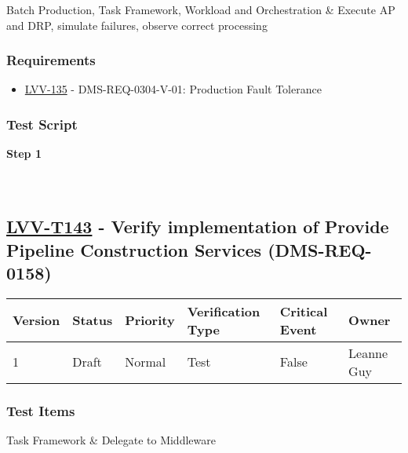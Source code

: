 Batch Production, Task Framework, Workload and Orchestration \& Execute
AP and DRP, simulate failures, observe correct processing

\hypertarget{requirements-119}{%
\subsubsection{Requirements}\label{requirements-119}}

\begin{itemize}
\tightlist
\item
  \href{https://jira.lsstcorp.org/browse/LVV-135}{LVV-135} -
  DMS-REQ-0304-V-01: Production Fault Tolerance
\end{itemize}

\hypertarget{test-script-119}{%
\subsubsection{Test Script}\label{test-script-119}}

\textbf{Step 1}\\
~\\
~\\

\hypertarget{lvv-t143---verify-implementation-of-provide-pipeline-construction-services-dms-req-0158}{%
\subsection{\texorpdfstring{\href{https://jira.lsstcorp.org/secure/Tests.jspa\#/testCase/LVV-T143}{LVV-T143}
- Verify implementation of Provide Pipeline Construction Services
(DMS-REQ-0158)}{LVV-T143 - Verify implementation of Provide Pipeline Construction Services (DMS-REQ-0158)}}\label{lvv-t143---verify-implementation-of-provide-pipeline-construction-services-dms-req-0158}}

\begin{longtable}[]{@{}llllll@{}}
\toprule
Version & Status & Priority & Verification Type & Critical Event &
Owner\tabularnewline
\midrule
\endhead
1 & Draft & Normal & Test & False & Leanne Guy\tabularnewline
\bottomrule
\end{longtable}

\hypertarget{test-items-119}{%
\subsubsection{Test Items}\label{test-items-119}}

Task Framework \& Delegate to Middleware

